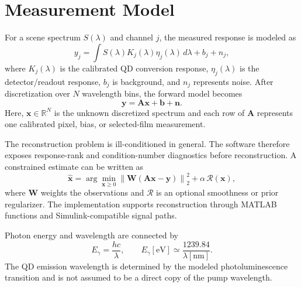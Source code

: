 \documentclass[conference]{IEEEtran}
\begin{document}
\section{Measurement Model}
For a scene spectrum $S(\lambda)$ and channel $j$, the measured response is modeled as
\begin{equation}
 y_j = \int S(\lambda)K_j(\lambda)\eta_j(\lambda)\,d\lambda+b_j+n_j,
 \label{eq:continuous}
\end{equation}
where $K_j(\lambda)$ is the calibrated QD conversion response, $\eta_j(\lambda)$ is the detector/readout response, $b_j$ is background, and $n_j$ represents noise. After discretization over $N$ wavelength bins, the forward model becomes
\begin{equation}
 \mathbf{y}=\mathbf{A}\mathbf{x}+\mathbf{b}+\mathbf{n}.
 \label{eq:discrete}
\end{equation}
Here, $\mathbf{x}\in\mathbb{R}^{N}$ is the unknown discretized spectrum and each row of $\mathbf{A}$ represents one calibrated pixel, bias, or selected-film measurement.

The reconstruction problem is ill-conditioned in general. The software therefore exposes response-rank and condition-number diagnostics before reconstruction. A constrained estimate can be written as
\begin{equation}
 \widehat{\mathbf{x}}=\arg\min_{\mathbf{x}\geq 0}
 \left\|\mathbf{W}(\mathbf{A}\mathbf{x}-\mathbf{y})\right\|_2^2
 +\alpha\,\mathcal{R}(\mathbf{x}),
 \label{eq:inverse}
\end{equation}
where $\mathbf{W}$ weights the observations and $\mathcal{R}$ is an optional smoothness or prior regularizer. The implementation supports reconstruction through MATLAB functions and Simulink-compatible signal paths.

Photon energy and wavelength are connected by
\begin{equation}
 E_\gamma=\frac{hc}{\lambda},\qquad E_\gamma[\mathrm{eV}]\simeq\frac{1239.84}{\lambda[\mathrm{nm}]}.
 \label{eq:energy}
\end{equation}
The QD emission wavelength is determined by the modeled photoluminescence transition and is not assumed to be a direct copy of the pump wavelength.
\end{document}
